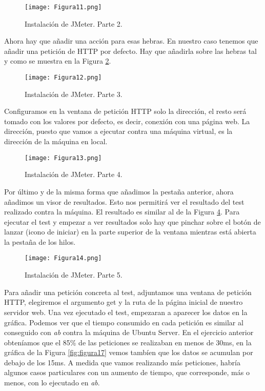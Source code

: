 \begin{figure}[H] 
\centering
\texttt{[image: Figura11.png]}  
\caption{Instalación de JMeter. Parte 2.}\label{fig:figura11}
\end{figure}

Ahora hay que añadir una acción para esas hebras. En nuestro caso tenemos que añadir una petición de HTTP por defecto. Hay que añadirla sobre las hebras tal y 
como se muestra en la Figura \ref{fig:figura12}.

\begin{figure}[H] 
\centering
\texttt{[image: Figura12.png]}  
\caption{Instalación de JMeter. Parte 3.}\label{fig:figura12}
\end{figure}

Configuramos en la ventana de petición HTTP solo la dirección, el resto será tomado con los valores por defecto, es decir, conexión con una página web. La dirección,
puesto que vamos a ejecutar contra una máquina virtual, es la dirección de la máquina en local.

\begin{figure}[H] 
\centering
\texttt{[image: Figura13.png]}  
\caption{Instalación de JMeter. Parte 4.}\label{fig:figura13}
\end{figure}

Por último y de la misma forma que añadimos la pestaña anterior, ahora añadimos un visor de resultados. Esto nos permitirá ver el resultado del test realizado contra la
máquina. El resultado es similar al de la Figura \ref{fig:figura14}. Para ejecutar el test y empezar a ver resultados solo hay que pinchar sobre el botón de lanzar (icono 
de iniciar) en la parte superior de la ventana mientras está abierta la pestaña de los hilos.

\begin{figure}[H] 
\centering
\texttt{[image: Figura14.png]}  
\caption{Instalación de JMeter. Parte 5.}\label{fig:figura14}
\end{figure}

Para añadir una petición concreta al test, adjuntamos una ventana de petición HTTP, elegiremos el argumento get y la ruta de la página inicial de nuestro servidor web.
Una vez ejecutado el test, empezaran a aparecer los datos en la gráfica. Podemos ver que el tiempo consumido en cada petición es similar al conseguido con \textit{ab} 
contra la máquina de Ubuntu Server. En el ejercicio anterior obteníamos que el 85\% de las peticiones se realizaban en menos de 30ms, en la gráfica de la 
Figura \ref{fig:figura17} vemos tambíen que los datos se acumulan por debajo de los 15ms. A medida que vamos realizando más peticiones, habría algunos casos 
particulares con un aumento de tiempo, que corresponde, más o menos, con lo ejecutado en \textit{ab}.

